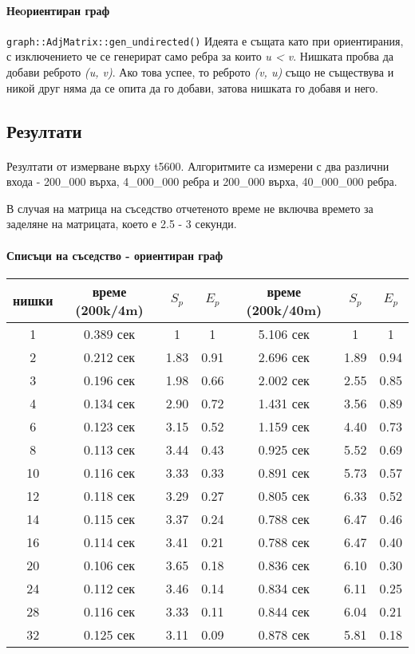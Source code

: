 \paragraph*{Неoриентиран граф} \verb|graph::AdjMatrix::gen_undirected()| Идеята е същата като при ориентирания, с изключението че се генерират само ребра за които \textit{u < v}. Нишката пробва да добави реброто \textit{(u, v)}. Ако това успее, то реброто \textit{(v, u)} също не съществува и никой друг няма да се опита да го добави, затова нишката го добавя и него.

\subsection{Резултати}

\paragraph*{} Резултати от измерване върху t5600. Алгоритмите са измерени с два различни входа - 200\_000 върха, 4\_000\_000 ребра и 200\_000 върха, 40\_000\_000 ребра.

В случая на матрица на съседство отчетеното време не включва времето за заделяне на матрицата, което е 2.5 - 3 секунди.

\paragraph*{Списъци на съседство - ориентиран граф}

\begin{center}
\begin{tabular}{ c | c c c | c c c | }
  нишки & време (200k/4m) & $S_p$ & $E_p$ & време (200k/40m) & $S_p$ & $E_p$ \\
  \hline
  1  & 0.389 сек & 1 & 1 & 5.106 сек & 1 & 1 \\
  2  & 0.212 сек & 1.83 & 0.91 & 2.696 сек & 1.89 & 0.94 \\
  3  & 0.196 сек & 1.98 & 0.66 & 2.002 сек & 2.55 & 0.85 \\
  4  & 0.134 сек & 2.90 & 0.72 & 1.431 сек & 3.56 & 0.89 \\
  6  & 0.123 сек & 3.15 & 0.52 & 1.159 сек & 4.40 & 0.73 \\
  8  & 0.113 сек & 3.44 & 0.43 & 0.925 сек & 5.52 & 0.69 \\
  10 & 0.116 сек & 3.33 & 0.33 & 0.891 сек & 5.73 & 0.57 \\
  12 & 0.118 сек & 3.29 & 0.27 & 0.805 сек & 6.33 & 0.52 \\
  14 & 0.115 сек & 3.37 & 0.24 & 0.788 сек & 6.47 & 0.46 \\
  16 & 0.114 сек & 3.41 & 0.21 & 0.788 сек & 6.47 & 0.40 \\
  20 & 0.106 сек & 3.65 & 0.18 & 0.836 сек & 6.10 & 0.30 \\
  24 & 0.112 сек & 3.46 & 0.14 & 0.834 сек & 6.11 & 0.25 \\
  28 & 0.116 сек & 3.33 & 0.11 & 0.844 сек & 6.04 & 0.21 \\
  32 & 0.125 сек & 3.11 & 0.09 & 0.878 сек & 5.81 & 0.18 \\
\end{tabular}
\end{center}

